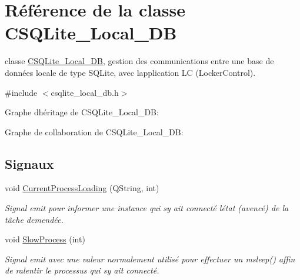 \hypertarget{class_c_s_q_lite___local___d_b}{}\section{Référence de la classe C\+S\+Q\+Lite\+\_\+\+Local\+\_\+\+D\+B}
\label{class_c_s_q_lite___local___d_b}


classe \hyperlink{class_c_s_q_lite___local___d_b}{C\+S\+Q\+Lite\+\_\+\+Local\+\_\+\+D\+B}, gestion des communications entre une base de données locale de type S\+Q\+Lite, avec l\textquotesingle{}application L\+C (Locker\+Control).  




{\ttfamily \#include $<$csqlite\+\_\+local\+\_\+db.\+h$>$}



Graphe d\textquotesingle{}héritage de C\+S\+Q\+Lite\+\_\+\+Local\+\_\+\+D\+B\+:


Graphe de collaboration de C\+S\+Q\+Lite\+\_\+\+Local\+\_\+\+D\+B\+:
\subsection*{Signaux}
\begin{DoxyCompactItemize}
\item 
void \hyperlink{class_c_s_q_lite___local___d_b_a492e644b65b4d602345483e84749c527}{Current\+Process\+Loading} (Q\+String, int)
\begin{DoxyCompactList}\small\item\em Signal emit pour informer une instance qui s\textquotesingle{}y ait connecté l\textquotesingle{}état (avencé) de la tâche demendée. \end{DoxyCompactList}\item 
void \hyperlink{class_c_s_q_lite___local___d_b_ad0e7d886718af92f60b63afe373f6680}{Slow\+Process} (int)
\begin{DoxyCompactList}\small\item\em Signal emit avec une valeur normalement utilisé pour effectuer un msleep() affin de ralentir le processus qui s\textquotesingle{}y ait connecté. \end{DoxyCompactList}\end{DoxyCompactItemize}
